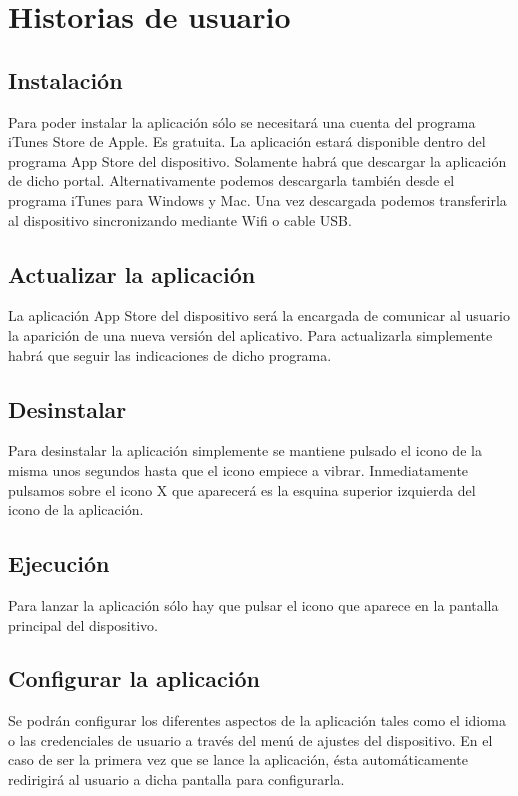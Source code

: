 \section{Historias de usuario}
\subsection{Instalación} Para poder instalar la aplicación sólo se necesitará una cuenta del programa iTunes Store de Apple. Es gratuita. La aplicación estará disponible dentro del programa App Store del dispositivo. Solamente habrá que descargar la aplicación de dicho portal. Alternativamente podemos descargarla también desde el programa iTunes para Windows y Mac. Una vez descargada podemos transferirla al dispositivo sincronizando mediante Wifi o cable USB. %
\subsection{Actualizar la aplicación}
La aplicación  App Store  del dispositivo será la encargada de comunicar al usuario la aparición de una nueva versión del aplicativo. Para actualizarla simplemente habrá que seguir las indicaciones de dicho programa. %

\subsection{Desinstalar}
Para desinstalar la aplicación simplemente se mantiene pulsado el icono de la misma unos segundos hasta que el icono empiece a vibrar. Inmediatamente pulsamos sobre el icono X que aparecerá es la esquina superior izquierda del icono de la aplicación. %
\subsection{Ejecución}
Para lanzar la aplicación sólo hay que pulsar el icono que aparece en la pantalla principal del dispositivo.
\subsection{Configurar la aplicación}
Se podrán configurar los diferentes aspectos de la aplicación tales como el idioma o las credenciales de usuario a través del menú de ajustes del dispositivo. En el caso de ser la primera vez que se lance la aplicación, ésta automáticamente redirigirá al usuario a dicha pantalla para configurarla.
